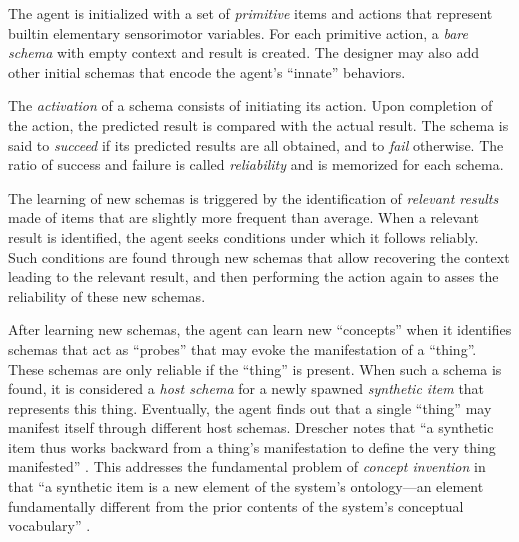 \documentclass[runningheads]{llncs}
\begin{document}
The agent is initialized with a set of \textit{primitive} items and actions that represent builtin elementary sensorimotor variables. 
For each primitive action, a \textit{bare schema} with empty context and result is created. 
The designer may also add other initial schemas that encode the agent's ``innate'' behaviors. 

The \textit{activation} of a schema consists of initiating its action. 
Upon completion of the action, the predicted result is compared with the actual result.
The schema is said to \textit{succeed} if its predicted results are all obtained, and to \textit{fail} otherwise. 
The ratio of success and failure is called \textit{reliability} and is memorized for each schema.  

The learning of new schemas is triggered by the identification of \textit{relevant results} made of items that are slightly more frequent than average. 
When a relevant result is identified, the agent seeks conditions under which it follows reliably. 
Such conditions are found through new schemas that allow recovering the context leading to the relevant result, and then performing the action again to asses the reliability of these new schemas. 

After learning new schemas, the agent can learn new ``concepts'' when it identifies schemas that act as ``probes'' that may evoke the manifestation of a ``thing''. 
These schemas are only reliable if the ``thing'' is present. 
When such a schema is found, it is considered a \textit{host schema} for a newly spawned \textit{synthetic item} that represents this thing.
Eventually, the agent finds out that a single ``thing'' may manifest itself through different host schemas. 
Drescher notes that ``a synthetic item thus works backward from a thing's manifestation to define the very thing manifested'' \cite[p. 83]{drescher_made-up_1991}.
This addresses the fundamental problem of \textit{concept invention} in that 
``a synthetic item is a new element of the system's ontology---an element fundamentally different from the prior contents of the system's conceptual vocabulary'' \cite[p. 81]{drescher_made-up_1991}.
\end{document}
